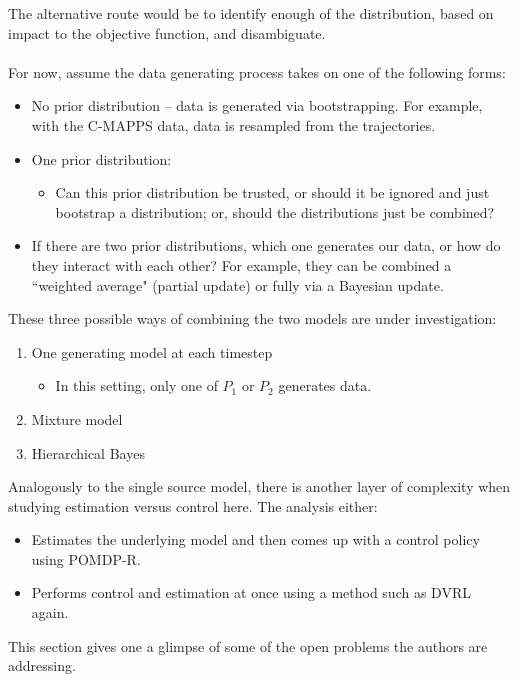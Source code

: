 \documentclass[english]{article}
\numberwithin{equation}{section}
\begin{document}
	The alternative route would be to identify enough of the distribution, based on impact to the objective function, and disambiguate. 
	\\
	\\
	For now, assume the data generating process takes on one of the following forms:
	\begin{itemize}
		\item No prior distribution -- data is generated via bootstrapping. For example, with the C-MAPPS data, data is resampled from the trajectories.
		\item One prior distribution:
		\begin{itemize}
			\item Can this prior distribution be trusted, or should it be ignored and just bootstrap a distribution; or, should the distributions just be combined?
		\end{itemize}
		\item If there are two prior distributions, which one generates our data, or how do they interact with each other? For example, they can be combined a ``weighted average" (partial update) or fully via a Bayesian update.
	\end{itemize}
	
	These three possible ways of combining the two models are under investigation:
	\begin{enumerate}
		\item One generating model at each timestep
			\begin{itemize}
				\item In this setting, only one of $P_1$ or $P_2$ generates data.
			\end{itemize}
		\item Mixture model
		\item Hierarchical Bayes
	\end{enumerate}
	
	Analogously to the single source model, there is another layer of complexity when studying estimation versus control here. The analysis either:
	\begin{itemize}
		\item Estimates the underlying model and then comes up with a control policy using POMDP-R.
		\item Performs control and estimation at once using a method such as DVRL again.
	\end{itemize}
	
	This section gives one a glimpse of some of the open problems the authors are addressing.
	
\end{document}
